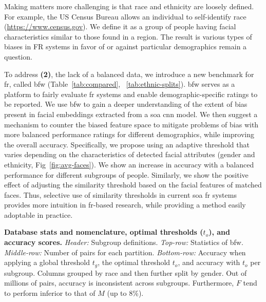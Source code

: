 Making matters more challenging is that race and ethnicity are loosely defined.  For example, the US Census Bureau allows an individual to self-identify race (\href{https://www.census.gov/mso/www/training/pdf/race-ethnicity-onepager.pdf}{https://www.census.gov}). We define it as a group of people having facial characteristics similar to those found in a region. The result is various types of biases in FR systems in favor of or against particular demographics remain a question.



To address \textbf{(2)}, the lack of a balanced data, we introduce a new benchmark for \gls{fr}, called \gls{bfw} (Table~\ref{tab:compared}, ~\ref{tab:ethnic-splits}). \gls{bfw} serves as a platform to fairly evaluate \gls{fr} systems and enable demographic-specific ratings to be reported. We use \gls{bfw} to gain a deeper understanding of the extent of bias present in facial embeddings extracted from a \gls{soa} \gls{cnn} model. We then suggest a mechanism to counter the biased feature space to mitigate problems of bias with more balanced performance ratings for different demographics, while improving the overall accuracy. Specifically, we propose using an adaptive threshold that varies depending on the characteristics of detected facial attributes (\ie gender and ethnicity, Fig~\ref{fig:avg-faces}). We show an increase in accuracy with a balanced performance for different subgroups of people. Similarly, we show the positive effect of adjusting the similarity threshold based on the facial features of matched faces. Thus, selective use of similarity thresholds in current \gls{soa} \gls{fr} systems provides more intuition in \gls{fr}-based research, while providing a method easily adoptable in practice. 


\begin{table}[!t]
    \centering
    \caption{\small{\textbf{Database stats and nomenclature, optimal thresholds ($t_o$), and accuracy scores.} \textit{Header:} Subgroup definitions. \textit{Top-row:} Statistics of \gls{bfw}. \textit{Middle-row:} Number of pairs for each partition. \textit{Bottom-row:} Accuracy when applying a global threshold $t_g$, the optimal threshold $t_o$, and accuracy with $t_o$ per subgroup. Columns grouped by race and then further split by gender. Out of millions of pairs, accuracy is inconsistent across subgroups. Furthermore, $F$ tend to perform inferior to that of $M$ (\ie up to 8\%).}}\label{tab:ethnic-splits}
    
    \vspace{-12pt}
\end{table}




